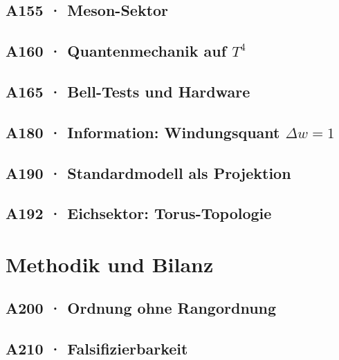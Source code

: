 \documentclass[11pt,twoside,openright]{book}
\begin{document}
\chapter[A155 · Meson-Sektor]{A155 · Meson-Sektor}


\chapter[A160 · Quantenmechanik auf $T^4$]{A160 · Quantenmechanik auf $T^4$}


\chapter[A165 · Bell-Tests und Hardware]{A165 · Bell-Tests und Hardware}


\chapter[A180 · Information]{A180 · Information: Windungsquant $\Delta w=1$}


\chapter[A190 · Standardmodell als Projektion]{A190 · Standardmodell als Projektion}


\chapter[A192 · Eichsektor]{A192 · Eichsektor: Torus-Topologie}


\part{Methodik und Bilanz}

\chapter[A200 · Ordnung ohne Rangordnung]{A200 · Ordnung ohne Rangordnung}


\chapter[A210 · Falsifizierbarkeit]{A210 · Falsifizierbarkeit}

\end{document}

